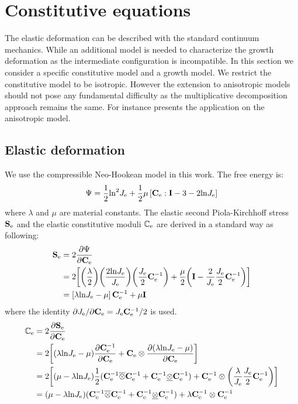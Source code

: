 \section{Constitutive equations}
The elastic deformation can be described with the standard continuum mechanics. While an additional model is needed to characterize the growth deformation as the intermediate configuration is incompatible. In this section we consider a specific constitutive model and a growth model. We restrict the constitutive model to be isotropic. However the extension to anisotropic models should not pose any fundamental difficulty as the multiplicative decomposition approach remains the same. For instance \cite{Goktepe2} presents the application on the anisotropic model.

\subsection{Elastic deformation}
We use the compressible Neo-Hookean model in this work. The free energy is:
\begin{equation}
\Psi = \frac{1}{2}\mathrm{ln}^2 J_{\mathrm{e}} + \frac{1}{2}\mu \left[ \bold{C}_{\mathrm{e}} : \bold{I} - 3 - 2\mathrm{ln} J_{\mathrm{e}} \right]
\end{equation}
where $\lambda$ and $\mu$ are material constants. The elastic second Piola-Kirchhoff stress $\bold{S}_{\mathrm{e}}$ and the elastic constitutive moduli $\mathbb{C}_{\mathrm{e}}$ are derived in a standard way as following:
\begin{equation} \label{eq:Se}
\begin{split}
\bold{S}_{\mathrm{e}} &= 2\frac{\partial \Psi}{\partial \bold{C}_{\mathrm{e}}} \\
	&= 2\bigg[  \bigg( \frac{\lambda}{2} \bigg) \bigg( \frac{2\mathrm{ln}J_{\mathrm{e}}}{J_{\mathrm{e}}} \bigg)       \bigg( \frac{J_{\mathrm{e}}}{2} \bold{C}_{\mathrm{e}}^{-1} \bigg) + \frac{\mu}{2} \bigg( \bold{I} - \frac{2}{J_{\mathrm{e}}} \frac{J_{\mathrm{e}}}{2} \bold{C}_{\mathrm{e}}^{-1} \bigg) \bigg] \\
	&= \left[ \lambda \mathrm{ln}J_{\mathrm{e}} - \mu\right]\bold{C}_{\mathrm{e}}^{-1} + \mu\bold{I}
\end{split}
\end{equation}
where the identity ${\partial J_{\mathrm{e}}}/{\partial \bold{C}_{\mathrm{e}}} = J_{\mathrm{e}} \bold{C}_{\mathrm{e}}^{-1}/2$ is used.
\begin{equation} \label{eq:Ce}
\begin{split}
\mathbb{C}_{\mathrm{e}} &= 2\frac{\partial \bold{S}_{\mathrm{e}}}{\partial \bold{C}_{\mathrm{e}}} \\
	&= 2\bigg[ (\lambda \mathrm{ln}J_{\mathrm{e}} - \mu) \frac{\partial \bold{C}_{\mathrm{e}}^{-1}}{\partial \bold{C}_{\mathrm{e}}} + \bold{C}_{\mathrm{e}} \otimes \frac{\partial (\lambda \mathrm{ln}J_{\mathrm{e}} - \mu)}{\partial \bold{C}_{\mathrm{e}}}\bigg] \\
	&= 2\bigg[ (\mu - \lambda \mathrm{ln}J_{\mathrm{e}}) \frac{1}{2}(\bold{C}_{\mathrm{e}}^{-1} \overline\otimes \bold{C}_{\mathrm{e}}^{-1} + \bold{C}_{\mathrm{e}}^{-1} \underline\otimes \bold{C}_{\mathrm{e}}^{-1}) + \bold{C}_{\mathrm{e}}^{-1} \otimes \bigg( \frac{\lambda}{J_{\mathrm{e}}}\frac{J_{\mathrm{e}}}{2} \bold{C}_{\mathrm{e}}^{-1} \bigg) \bigg] \\
	&= (\mu - \lambda \mathrm{ln}J_{\mathrm{e}}) (\bold{C}_{\mathrm{e}}^{-1} \overline\otimes \bold{C}_{\mathrm{e}}^{-1} + \bold{C}_{\mathrm{e}}^{-1} \underline\otimes \bold{C}_{\mathrm{e}}^{-1} ) + \lambda \bold{C}_{\mathrm{e}}^{-1} \otimes \bold{C}_{\mathrm{e}}^{-1}
\end{split}
\end{equation}
